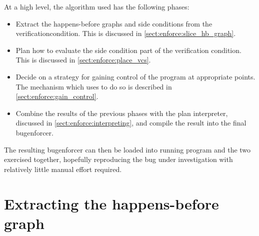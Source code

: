 At a high level, the algorithm used has the following phases:
\begin{itemize}
\item
  Extract the happens-before graphs and side conditions from the
  \gls{verificationcondition}.  This is discussed in
  \autoref{sect:enforce:slice_hb_graph}.
\item
  Plan how to evaluate the side condition part of the verification
  condition.  This is discussed in \autoref{sect:enforce:place_vcs}.
\item
  Decide on a strategy for gaining control of the program at
  appropriate points.  The mechanism which {\technique} uses to do so
  is described in \autoref{sect:enforce:gain_control}.
\item
  Combine the results of the previous phases with the \gls{plan
    interpreter}, discussed in \autoref{sect:enforce:interpreting},
  and compile the result into the final \gls{bugenforcer}.
\end{itemize}
The resulting \gls{bugenforcer} can then be loaded into running
program and the two exercised together, hopefully reproducing the bug
under investigation with relatively little manual effort required.

\section{Extracting the happens-before graph}
\label{sect:enforce:slice_hb_graph}

